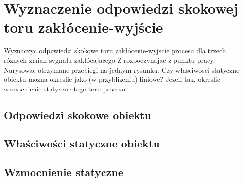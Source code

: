 \section{Wyznaczenie odpowiedzi skokowej toru zakłócenie-wyjście}

Wyznaczyc odpowiedzi skokowe toru zakłócenie-wyjscie procesu dla trzech róznych
zmian sygnału zakłócajacego Z rozpoczynajac z punktu pracy. Narysowac otrzymane
przebiegi na jednym rysunku. Czy własciwosci statyczne obiektu mozna okreslic jako
(w przyblizeniu) liniowe? Jezeli tak, okreslic wzmocnienie statyczne tego toru procesu.

\subsection{Odpowiedzi skokowe obiektu}

\subsection{Właściwości statyczne obiektu}

\subsection{Wzmocnienie statyczne}

